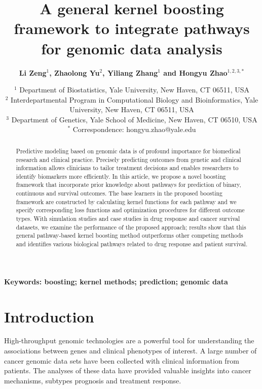 \documentclass[a4paper,12pt]{article}
\begin{document}
	\title{\bf A general kernel boosting framework to integrate pathways for genomic data analysis}
	\author{\bf Li Zeng$^{1}$, Zhaolong Yu$^2$, Yiliang Zhang$^1$ and Hongyu Zhao$^{1,2,3,*}$}
	\date{
		$^1$ Department of Biostatistics, Yale University, New Haven, CT 06511, USA\\
	$^2$ Interdepartmental Program in Computational Biology and Bioinformatics, Yale University, New Haven, CT 06511, USA\\
	$^3$ Department of Genetics, Yale School of Medicine, New Haven, CT 06510, USA\\
	$^*$ Correspondence: hongyu.zhao@yale.edu
}
	\maketitle
	\begin{abstract}
Predictive modeling based on genomic data is of profound importance for biomedical research and clinical practice. Precisely predicting outcomes from genetic and clinical information allows clinicians to tailor treatment decisions and enables researchers to identify biomarkers more efficiently. In this article, we propose a novel boosting framework that incorporate prior knowledge about pathways for prediction of binary, continuous and survival outcomes. The base learners in the proposed boosting framework are constructed by calculating kernel functions for each pathway and we specify corresponding loss functions and optimization procedures for different outcome types. With simulation studies and case studies in drug response and cancer survival datasets, we examine the performance of the proposed approach; results show that this general pathway-based kernel boosting method outperforms other competing methods and identifies various biological pathways related to drug response and patient survival.
		\end{abstract}

		\begin{center}
			\textbf{Keywords: boosting; kernel methods; prediction; genomic data}
			\end{center}

	

	\section{Introduction}
High-throughput genomic technologies are a powerful tool for understanding the associations between genes and clinical phenotypes of interest. A large number of cancer genomic data sets have been collected with clinical information from patients. The analyses of these data have provided valuable insights into cancer mechanisms, subtypes prognosis and treatment response.
	
\end{document}
